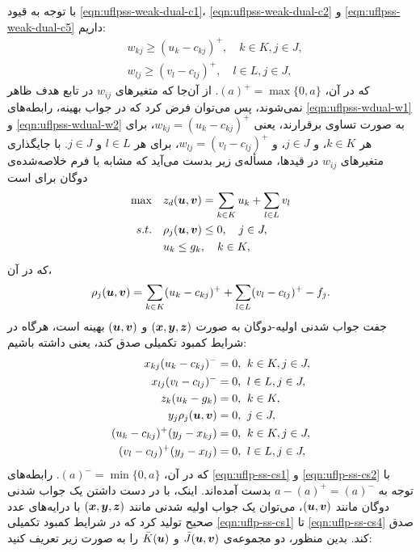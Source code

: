 با توجه به قیود \eqref{eqn:uflpss-weak-dual-c1}، \eqref{eqn:uflpss-weak-dual-c2} و \eqref{eqn:uflpss-weak-dual-c5} داریم:
\begin{align}
& w_{kj} \geq (u_k-c_{kj})^+, \quad k\in K, j\in J, \label{eqn:uflpss-wdual-w1}\\
& w_{lj} \geq (v_l-c_{lj})^+, \quad l\in L, j\in J, \label{eqn:uflpss-wdual-w2}
\end{align}
که در آن، $(a)^+=\max\{0,a\}$. از آن‌جا که متغیرهای $w_{ij}$ در تابع هدف ظاهر نمی‌شوند، پس می‌توان فرض کرد  که در جواب بهینه، رابطه‌های \eqref{eqn:uflpss-wdual-w1} و \eqref{eqn:uflpss-wdual-w2} به صورت تساوی برقرارند، یعنی $w_{kj} = (u_k-c_{kj})^+$، برای هر $k\in K$، و $j\in J$، و $w_{lj} = (v_l-c_{lj})^+$، برای هر $l\in L$ و $j\in J$. با جایگذاری متغیرهای $w_{ij}$ در قید‌ها، مسأله‌ی زیر بدست می‌آید که مشابه با فرم خلاصه‌شده‌ی دوگان برای  است
 \begin{align}
 \max  \quad   &  z_d({\boldsymbol u},{\boldsymbol v}) = \sum_{k\in K} u_k + \sum_{l\in L} v_l  \label{eqn:uflpss-con-wdual-obj} \\
 s. t. \quad     &   \rho_j({\boldsymbol u},{\boldsymbol v})\leq 0,        \quad j\in J,  \label{eqn:uflpss-con-wdual-c1}\\
               &   u_k \leq g_k,                      \quad k\in K, \label{eqn:uflpss-con-wdual-c2}
 \end{align}
 که در آن،
 \begin{align*}
 \rho_j({\boldsymbol u},{\boldsymbol v}) = \sum_{k\in K} (u_k-c_{kj})^+ +  \sum_{l\in L} (v_l-c_{lj})^+ - f_j.
 \end{align*}
 جفت جواب شدنی اولیه-دوگان به صورت $({\boldsymbol x},{\boldsymbol y},{\boldsymbol z})$  و $({\boldsymbol u},{\boldsymbol v})$ بهینه است، هرگاه در شرایط کمبود تکمیلی صدق کند، یعنی داشته باشیم:
\begin{align}
 x_{kj} ( u_k - c_{kj} )^- = 0, \; &\; k\in K, j\in J,                     \label{eqn:uflp-ss-cs1}\\
 x_{lj} ( v_l - c_{lj} )^- = 0, \; & \;l\in L, j\in J,                    \label{eqn:uflp-ss-cs2}\\
 z_k (u_k - g_k) = 0, \; & \;k\in K,                            \label{eqn:uflp-ss-cs3}\\
 y_j \rho_j({\boldsymbol u},{\boldsymbol v})  = 0, \; & \;j\in J,                                    \label{eqn:uflp-ss-cs4}\\
 ( u_k - c_{kj} )^+( y_j - x_{kj} ) =0, \; & \;k\in K, j\in J,  \label{eqn:uflp-ss-cs5}\\
 ( v_l - c_{lj} )^+( y_j - x_{lj} ) =0, \; & \;l\in L, j\in J,  \label{eqn:uflp-ss-cs6}
\end{align}
که در آن، $(a)^-=\min\{0,a\}$. رابطه‌های \eqref{eqn:uflp-ss-cs1} و \eqref{eqn:uflp-ss-cs2} با توجه به   $a-(a)^+=(a)^-$ بدست آمده‌اند. اینک، با در دست داشتن یک جواب شدنی دوگان مانند $({\boldsymbol u},{\boldsymbol v})$، می‌توان یک جواب اولیه شدنی مانند $({\boldsymbol x},{\boldsymbol y},{\boldsymbol z})$  با درایه‌های  عدد صحیح تولید کرد که در شرایط کمبود تکمیلی \eqref{eqn:uflp-ss-cs1} تا \eqref{eqn:uflp-ss-cs4} صدق کند.  بدین منظور، دو مجموعه‌ی $\bar J({\boldsymbol u},{\boldsymbol v})$ و $\bar K({\boldsymbol u})$ را به صورت زیر تعریف کنید: 


